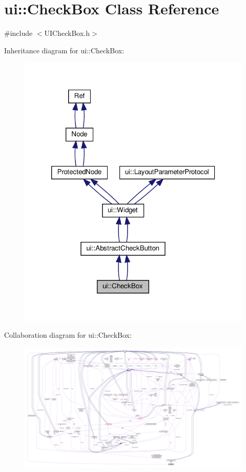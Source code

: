 \hypertarget{classui_1_1CheckBox}{}\section{ui\+:\+:Check\+Box Class Reference}
\label{classui_1_1CheckBox}


{\ttfamily \#include $<$U\+I\+Check\+Box.\+h$>$}



Inheritance diagram for ui\+:\+:Check\+Box\+:
\nopagebreak
\begin{figure}[H]
\begin{center}
\leavevmode
\includegraphics[width=320pt]{classui_1_1CheckBox__inherit__graph}
\end{center}
\end{figure}


Collaboration diagram for ui\+:\+:Check\+Box\+:
\nopagebreak
\begin{figure}[H]
\begin{center}
\leavevmode
\includegraphics[width=350pt]{classui_1_1CheckBox__coll__graph}
\end{center}
\end{figure}
